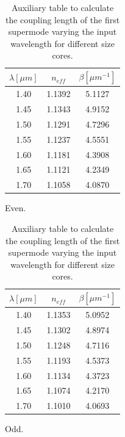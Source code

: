 \documentclass[a4paper,12pt]{article}
\begin{document}
\begin{table}[H]
    \centering
    \begin{subtable}{0.45\textwidth}
        \centering
        \begin{tabular}{ccc}
            \toprule
            $\lambda [\mu m]$ & $n_{eff}$ & $\beta [\mu m^{-1}]$ \\
            \midrule
            1.40 & 1.1392 & 5.1127 \\
            1.45 & 1.1343 & 4.9152 \\
            1.50 & 1.1291 & 4.7296 \\
            1.55 & 1.1237 & 4.5551 \\
            1.60 & 1.1181 & 4.3908 \\
            1.65 & 1.1121 & 4.2349 \\
            1.70 & 1.1058 & 4.0870 \\
            \bottomrule
        \end{tabular}
        \caption{Even.}
    \end{subtable}
    \hfill
    \begin{subtable}{0.45\textwidth}
        \centering
        \begin{tabular}{ccc}
            \toprule
            $\lambda [\mu m]$ & $n_{eff}$ & $\beta [\mu m^{-1}]$ \\
            \midrule
            1.40 & 1.1353 & 5.0952 \\
            1.45 & 1.1302 & 4.8974 \\
            1.50 & 1.1248 & 4.7116 \\
            1.55 & 1.1193 & 4.5373 \\
            1.60 & 1.1134 & 4.3723 \\
            1.65 & 1.1074 & 4.2170 \\
            1.70 & 1.1010 & 4.0693 \\
            \bottomrule
        \end{tabular}
        \caption{Odd.}
    \end{subtable}
    \caption{Auxiliary table to calculate the coupling length of the first supermode varying the input wavelength for different size cores.}
    \label{tab:wv_var_aux_doub}
\end{table}
\end{document}
